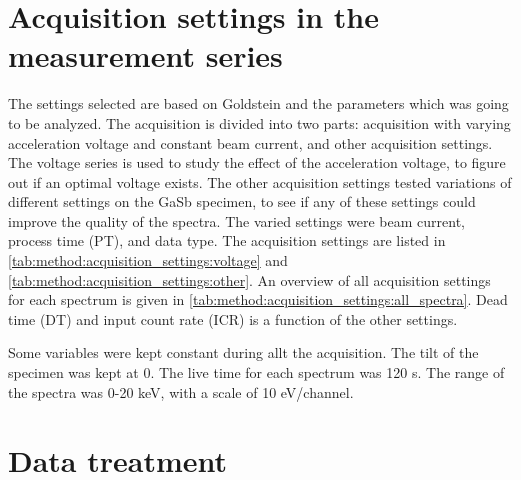 \section{Acquisition settings in the measurement series}
\label{method:acquisition_settings}

The settings selected are based on Goldstein \cite{goldstein_scanning_2018} and the parameters which was going to be analyzed.
The acquisition is divided into two parts: acquisition with varying acceleration voltage and constant beam current, and other acquisition settings.
The voltage series is used to study the effect of the acceleration voltage, to figure out if an optimal voltage exists.
The other acquisition settings tested variations of different settings on the GaSb specimen, to see if any of these settings could improve the quality of the spectra.
The varied settings were beam current, process time (PT), and data type.
The acquisition settings are listed in \cref{tab:method:acquisition_settings:voltage} and \cref{tab:method:acquisition_settings:other}.
An overview of all acquisition settings for each spectrum is given in \cref{tab:method:acquisition_settings:all_spectra}.
Dead time (DT) and input count rate (ICR) is a function of the other settings.


Some variables were kept constant during allt the acquisition.
The tilt of the specimen was kept at 0\textdegree.
The live time for each spectrum was 120 s.
The range of the spectra was 0-20 keV, with a scale of 10 eV/channel.






































\section{Data treatment}
\label{method:data_treatment}

